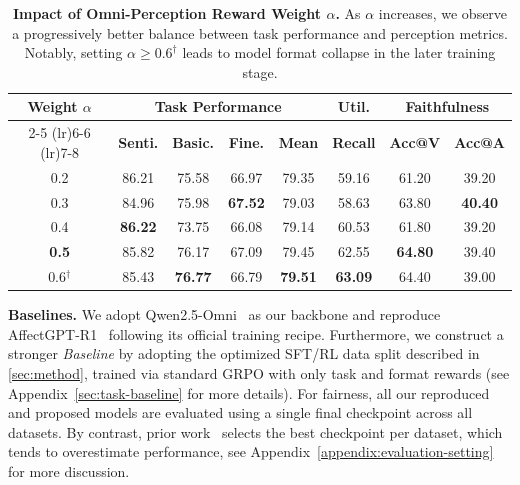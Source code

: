 \documentclass{article}
\theoremstyle{plain}
\theoremstyle{definition}
\theoremstyle{remark}
\begin{document}
\begin{table}[t]
\centering

\fontsize{8}{10}\selectfont
\renewcommand{\arraystretch}{1.2}
\setlength{\tabcolsep}{3.2pt}

\caption{\textbf{Impact of Omni-Perception Reward Weight $\alpha$.} As $\alpha$ increases, we observe a progressively better balance between task performance and perception metrics. Notably, setting $\alpha \ge 0.6^\dagger$ leads to model format collapse in the later training stage.}
\label{tab:ablation_alpha}

\begin{tabular}{c c c c c c c c}
    \toprule

    \multirow{2}{*}{\textbf{Weight $\alpha$}} 
    & \multicolumn{4}{c}{\textbf{Task Performance}} 
    & \textbf{Util.} 
    & \multicolumn{2}{c}{\textbf{Faithfulness}} \\
    \cmidrule(lr){2-5} 
    \cmidrule(lr){6-6} 
    \cmidrule(lr){7-8}
    
    & \textbf{Senti.} 
    & \textbf{Basic.} 
    & \textbf{Fine.} 
    & \textbf{Mean} 
    & \textbf{Recall} 
    & \textbf{Acc@V} 
    & \textbf{Acc@A} \\
    \midrule

    0.2 & 86.21 & 75.58 & 66.97 & 79.35 & 59.16 & 61.20 & 39.20 \\
    0.3 & 84.96 & 75.98 & \textbf{67.52} & 79.03 & 58.63 & 63.80 & \textbf{40.40} \\
    0.4 & \textbf{86.22} & 73.75 & 66.08 & 79.14 & 60.53 & 61.80 & 39.20 \\
    
    \rowcolor{tabhighlight} 
    \textbf{0.5} & 85.82 & 76.17 & 67.09 & 79.45 & 62.55 & \textbf{64.80} & 39.40 \\
    
    0.6$^\dagger$ & 85.43 & \textbf{76.77} & 66.79 & \textbf{79.51} & \textbf{63.09} & 64.40 & 39.00 \\
    
    \bottomrule
\end{tabular}
\vspace{-3mm}
\end{table}




    
    
    
    


\noindent\textbf{Baselines.}
We adopt Qwen2.5-Omni~\cite{xu2025qwen2} as our backbone and reproduce AffectGPT-R1~\cite{lian2025affectgptr1} following its official training recipe.
Furthermore, we construct a stronger \textit{Baseline} by adopting the optimized SFT/RL data split described in \cref{sec:method}, trained via standard GRPO with only task and format rewards (see Appendix~\ref{sec:task-baseline} for more details).
For fairness, all our reproduced and proposed models are evaluated using a single final checkpoint across all datasets.
By contrast, prior work~\cite{lian2025affectgpt, lian2025affectgptr1} selects the best checkpoint per dataset, which tends to overestimate performance, see Appendix~\ref{appendix:evaluation-setting} for more discussion.
\end{document}

